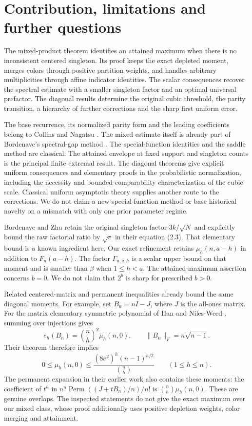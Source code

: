 \section{Contribution, limitations and further questions}

The mixed-product theorem identifies an attained maximum when there is no inconsistent centered singleton. Its proof keeps the exact depleted moment, merges colors through positive partition weights, and handles arbitrary multiplicities through affine indicator identities. The scalar consequences recover the spectral estimate with a smaller singleton factor and an optimal universal prefactor. The diagonal results determine the original cubic threshold, the parity transition, a hierarchy of further corrections and the sharp first uniform error.

The base recurrence, its normalized parity form and the leading coefficients belong to Collins and Nagatsu \cite{CN}. The mixed estimate itself is already part of Bordenave's spectral-gap method \cite{Bordenave}. The special-function identities and the saddle method are classical. The attained envelope at fixed support and singleton counts is the principal finite extremal result. The diagonal theorems give explicit uniform consequences and elementary proofs in the probabilistic normalization, including the necessity and bounded-comparability characterization of the cubic scale. Classical uniform asymptotic theory supplies another route to the corrections. We do not claim a new special-function method or base historical novelty on a mismatch with only one prior parameter regime.

Bordenave and Zhu \cite[Lemma 2.1]{BZ} retain the original singleton factor $3k/\sqrt N$ and explicitly bound the raw factorial ratio by $\sqrt e$ in their equation (2.3). That elementary bound is a known ingredient here. Our exact refinement retains $\mu_h(n,a-h)$ in addition to $F_n(a-h)$. The factor $\Gamma_{n,a,h}$ is a scalar upper bound on that moment and is smaller than $\beta$ when $1\le h<a$. The attained-maximum assertion concerns $b=0$. We do not claim that $2^b$ is sharp for prescribed $b>0$.

Related centered-matrix and permanent inequalities already bound the same diagonal moments. For example, set $B_n=nI-J$, where $J$ is the all-ones matrix. For the matrix elementary symmetric polynomial of Han and Niles-Weed \cite[equation (2), Theorem 1.2]{HNcentered}, summing over injections gives
\[
e_h(B_n)=\binom nh^2\mu_h(n,0),\qquad
\|B_n\|_F=n\sqrt{n-1}.
\]
Their theorem therefore implies
\[
0\le\mu_h(n,0)\le
\frac{(8e^2)^h(n-1)^{h/2}}{\binom nh}\qquad(1\le h\le n).
\]
The permanent expansion in their earlier work \cite[equation (29), Lemma 5.5 in the inspected preprint]{HNmixtures} also contains these moments: the coefficient of $t^h$ in
$n^n\operatorname{Perm}((J+tB_n)/n)/n!$ is $\binom nh\mu_h(n,0)$.
These are genuine overlaps. The inspected statements do not give the exact maximum over our mixed class, whose proof additionally uses positive depletion weights, color merging and attainment.

